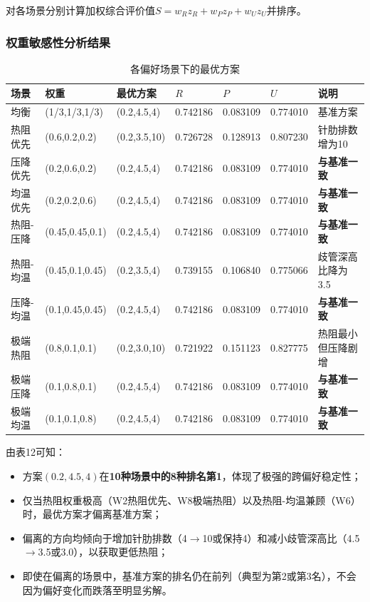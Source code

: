 \documentclass[12pt,a4paper]{ctexart}
\begin{document}
对各场景分别计算加权综合评价值$S = w_R z_R + w_P z_P + w_U z_U$并排序。

\subsubsection{权重敏感性分析结果}

\begin{table}[H]
\centering
\caption{各偏好场景下的最优方案}
\footnotesize
\begin{tabular}{p{}p{}p{}p{}p{}p{}p{}}
\toprule
场景 & 权重 & 最优方案 & $R$ & $P$ & $U$ & 说明 \\
\midrule
均衡 & (1/3,1/3,1/3) & (0.2,4.5,4) & 0.742186 & 0.083109 & 0.774010 & 基准方案 \\
热阻优先 & (0.6,0.2,0.2) & (0.2,3.5,10) & 0.726728 & 0.128913 & 0.807230 & 针肋排数增为10 \\
压降优先 & (0.2,0.6,0.2) & (0.2,4.5,4) & 0.742186 & 0.083109 & 0.774010 & \textbf{与基准一致} \\
均温优先 & (0.2,0.2,0.6) & (0.2,4.5,4) & 0.742186 & 0.083109 & 0.774010 & \textbf{与基准一致} \\
热阻-压降 & (0.45,0.45,0.1) & (0.2,4.5,4) & 0.742186 & 0.083109 & 0.774010 & \textbf{与基准一致} \\
热阻-均温 & (0.45,0.1,0.45) & (0.2,3.5,4) & 0.739155 & 0.106840 & 0.775066 & 歧管深高比降为3.5 \\
压降-均温 & (0.1,0.45,0.45) & (0.2,4.5,4) & 0.742186 & 0.083109 & 0.774010 & \textbf{与基准一致} \\
极端热阻 & (0.8,0.1,0.1) & (0.2,3.0,10) & 0.721922 & 0.151123 & 0.827775 & 热阻最小但压降剧增 \\
极端压降 & (0.1,0.8,0.1) & (0.2,4.5,4) & 0.742186 & 0.083109 & 0.774010 & \textbf{与基准一致} \\
极端均温 & (0.1,0.1,0.8) & (0.2,4.5,4) & 0.742186 & 0.083109 & 0.774010 & \textbf{与基准一致} \\
\bottomrule
\end{tabular}
\end{table}

由表12可知：
\begin{itemize}
\item 方案$(0.2,4.5,4)$在\textbf{10种场景中的8种排名第1}，体现了极强的跨偏好稳定性；
\item 仅当热阻权重极高（W2热阻优先、W8极端热阻）以及热阻-均温兼顾（W6）时，最优方案才偏离基准方案；
\item 偏离的方向均倾向于增加针肋排数（4$\to$10或保持4）和减小歧管深高比（4.5$\to$3.5或3.0），以获取更低热阻；
\item 即使在偏离的场景中，基准方案的排名仍在前列（典型为第2或第3名），不会因为偏好变化而跌落至明显劣解。
\end{itemize}
\end{document}
